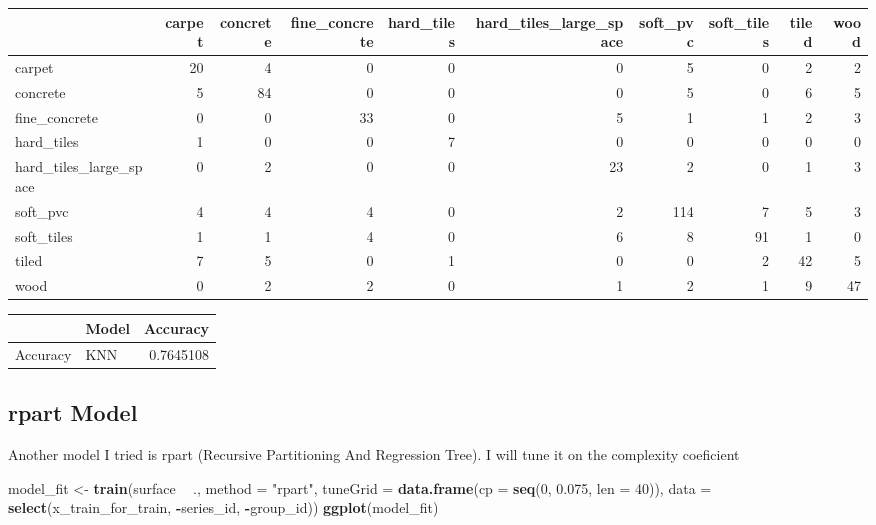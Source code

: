 \documentclass[]{article}
\newenvironment{Shaded}{\begin{snugshade}}{\end{snugshade}}
\newcommand{\CommentTok}[1]{\textcolor[rgb]{0.56,0.35,0.01}{\textit{#1}}}
\newcommand{\DataTypeTok}[1]{\textcolor[rgb]{0.13,0.29,0.53}{#1}}
\newcommand{\DecValTok}[1]{\textcolor[rgb]{0.00,0.00,0.81}{#1}}
\newcommand{\FloatTok}[1]{\textcolor[rgb]{0.00,0.00,0.81}{#1}}
\newcommand{\KeywordTok}[1]{\textcolor[rgb]{0.13,0.29,0.53}{\textbf{#1}}}
\newcommand{\NormalTok}[1]{#1}
\newcommand{\OperatorTok}[1]{\textcolor[rgb]{0.81,0.36,0.00}{\textbf{#1}}}
\newcommand{\StringTok}[1]{\textcolor[rgb]{0.31,0.60,0.02}{#1}}
\begin{document}
\begin{longtable}[]{@{}lrrrrrrrrr@{}}
\toprule
& carpet & concrete & fine\_concrete & hard\_tiles &
hard\_tiles\_large\_space & soft\_pvc & soft\_tiles & tiled &
wood\tabularnewline
\midrule
\endhead
carpet & 20 & 4 & 0 & 0 & 0 & 5 & 0 & 2 & 2\tabularnewline
concrete & 5 & 84 & 0 & 0 & 0 & 5 & 0 & 6 & 5\tabularnewline
fine\_concrete & 0 & 0 & 33 & 0 & 5 & 1 & 1 & 2 & 3\tabularnewline
hard\_tiles & 1 & 0 & 0 & 7 & 0 & 0 & 0 & 0 & 0\tabularnewline
hard\_tiles\_large\_space & 0 & 2 & 0 & 0 & 23 & 2 & 0 & 1 &
3\tabularnewline
soft\_pvc & 4 & 4 & 4 & 0 & 2 & 114 & 7 & 5 & 3\tabularnewline
soft\_tiles & 1 & 1 & 4 & 0 & 6 & 8 & 91 & 1 & 0\tabularnewline
tiled & 7 & 5 & 0 & 1 & 0 & 0 & 2 & 42 & 5\tabularnewline
wood & 0 & 2 & 2 & 0 & 1 & 2 & 1 & 9 & 47\tabularnewline
\bottomrule
\end{longtable}

\begin{Shaded}
\end{Shaded}

\begin{longtable}[]{@{}llr@{}}
\toprule
& Model & Accuracy\tabularnewline
\midrule
\endhead
Accuracy & KNN & 0.7645108\tabularnewline
\bottomrule
\end{longtable}

\hypertarget{rpart-model}{%
\subsection{rpart Model}\label{rpart-model}}

Another model I tried is rpart (Recursive Partitioning And Regression
Tree). I will tune it on the complexity coeficient

\begin{Shaded}
\begin{Highlighting}[]
\NormalTok{model_fit <-}\StringTok{ }\KeywordTok{train}\NormalTok{(surface }\OperatorTok{~}\StringTok{ }\NormalTok{., }
                     \DataTypeTok{method =} \StringTok{"rpart"}\NormalTok{,}
                     \DataTypeTok{tuneGrid =} \KeywordTok{data.frame}\NormalTok{(}\DataTypeTok{cp =} \KeywordTok{seq}\NormalTok{(}\DecValTok{0}\NormalTok{, }\FloatTok{0.075}\NormalTok{, }\DataTypeTok{len =} \DecValTok{40}\NormalTok{)),}
                     \DataTypeTok{data =} \KeywordTok{select}\NormalTok{(x_train_for_train, }\OperatorTok{-}\NormalTok{series_id, }\OperatorTok{-}\NormalTok{group_id))}
\KeywordTok{ggplot}\NormalTok{(model_fit)}
\end{Highlighting}
\end{Shaded}
\end{document}
